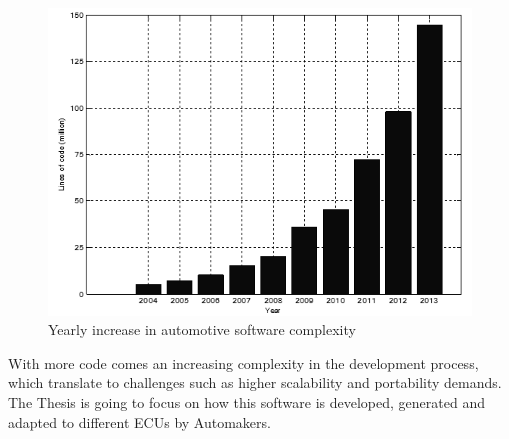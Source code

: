\documentclass[../main.tex]{subfiles}
\begin{document}
\begin{figure}[H]
    \centering
    \includegraphics[width=0.6\linewidth]{images_folder/Yearly-increase-in-automotive-software-complexity-shown-by-million-lines-of-code-of-1-ConvertImage.png}
    \caption{Yearly increase in automotive software complexity}
    \label{fig:yearlyincreas}
\end{figure}
With more code comes an increasing complexity in the development process, which translate to challenges such as higher scalability and portability demands. The Thesis is going to focus on how this software is developed, generated and adapted to different \gls{ECU}s by Automakers.
\end{document}
